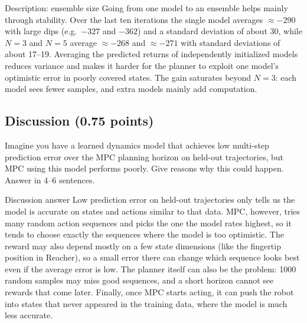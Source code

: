 \documentclass{article}
\begin{document}
\begin{answer}{Description: ensemble size}
\small Going from one model to an ensemble helps mainly through stability. Over the last ten iterations the single model averages $\approx-290$ with large dips (e.g.\ $-327$ and $-362$) and a standard deviation of about 30, while $N{=}3$ and $N{=}5$ average $\approx-268$ and $\approx-271$ with standard deviations of about 17--19. Averaging the predicted returns of independently initialized models reduces variance and makes it harder for the planner to exploit one model's optimistic error in poorly covered states. The gain saturates beyond $N{=}3$: each model sees fewer samples, and extra models mainly add computation.
\end{answer}
\newpage
\subsection*{Discussion (0.75 points)}
Imagine you have a learned dynamics model that achieves low multi-step prediction error over the MPC planning horizon on held-out trajectories, but MPC using this model performs poorly. Give reasons why this could happen. Answer in 4--6 sentences.
\begin{answer}{Discussion answer}
\small Low prediction error on held-out trajectories only tells us the model is accurate on states and actions similar to that data. MPC, however, tries many random action sequences and picks the one the model rates highest, so it tends to choose exactly the sequences where the model is too optimistic. The reward may also depend mostly on a few state dimensions (like the fingertip position in Reacher), so a small error there can change which sequence looks best even if the average error is low. The planner itself can also be the problem: 1000 random samples may miss good sequences, and a short horizon cannot see rewards that come later. Finally, once MPC starts acting, it can push the robot into states that never appeared in the training data, where the model is much less accurate.
\end{answer}
\end{document}
